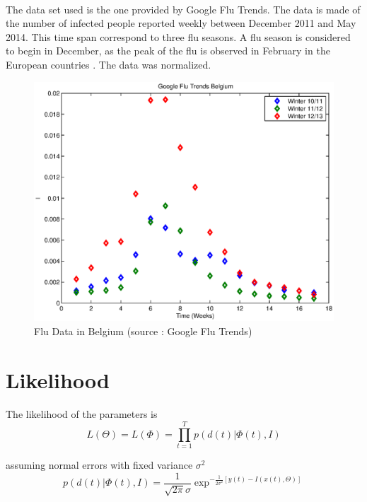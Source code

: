 \documentclass[11pt, a4paper]{article}
\begin{document}
\paragraph{}
The data set used is the one provided by Google Flu Trends. The data is made of the number of infected people reported weekly between December 2011 and May 2014. This time span correspond to three flu seasons. A flu season is considered to begin in December, as the peak of the flu is observed in February in the European countries \cite{baumgartner2012seasonality}. The data was normalized. 

\begin{figure}[h]
\FloatBarrier
\center
   \includegraphics[width = \textwidth]{figures/FluData.eps}
   \caption{Flu Data in Belgium (source : Google Flu Trends)}
   \label{fig:fluData}
\end{figure}

\section{Likelihood}
\paragraph{}
The likelihood of the parameters is 
\begin{equation}
L(\Theta) = L(\Phi) = \prod_{t=1}^T p( d(t) | \Phi(t),I) 
\label{eq:likelihood}
\end{equation}

assuming normal errors with fixed variance $\sigma^2$
\begin{equation}
p(d(t) | \Phi(t),I) = \frac{1}{\sqrt{2\pi}\sigma} \exp^{-\frac{1}{2\sigma^2}[y(t) - I(x(t), \Theta)]}
\label{eq:gaussianPrior}
\end{equation}
\end{document}
